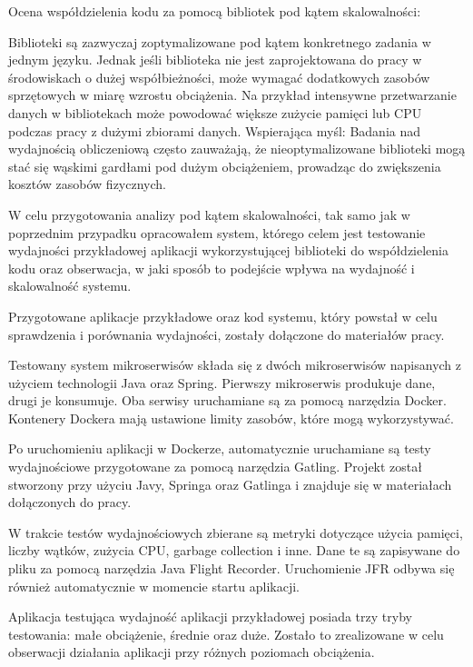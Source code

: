 \documentclass[runningheads,12pt]{llncs}
\begin{document}
\newpage


Ocena współdzielenia kodu za pomocą bibliotek pod kątem skalowalności:

Biblioteki są zazwyczaj zoptymalizowane pod kątem konkretnego zadania w jednym języku. Jednak jeśli biblioteka nie jest zaprojektowana do pracy w środowiskach o dużej współbieżności, może wymagać dodatkowych zasobów sprzętowych w miarę wzrostu obciążenia. Na przykład intensywne przetwarzanie danych w bibliotekach może powodować większe zużycie pamięci lub CPU podczas pracy z dużymi zbiorami danych. Wspierająca myśl: Badania nad wydajnością obliczeniową często zauważają, że nieoptymalizowane biblioteki mogą stać się wąskimi gardłami pod dużym obciążeniem, prowadząc do zwiększenia kosztów zasobów fizycznych. ~\cite[p. 192]{fowler2012patterns}

W celu przygotowania analizy pod kątem skalowalności, tak samo jak w poprzednim przypadku opracowałem system, którego celem jest testowanie wydajności przykładowej aplikacji wykorzystującej biblioteki do współdzielenia kodu oraz obserwacja, w jaki sposób to podejście wpływa na wydajność i skalowalność systemu.

Przygotowane aplikacje przykładowe oraz kod systemu, który powstał w celu sprawdzenia i porównania wydajności, zostały dołączone do materiałów pracy.

Testowany system mikroserwisów składa się z dwóch mikroserwisów napisanych z użyciem technologii Java oraz Spring. Pierwszy mikroserwis produkuje dane, drugi je konsumuje. Oba serwisy uruchamiane są za pomocą narzędzia Docker. Kontenery Dockera mają ustawione limity zasobów, które mogą wykorzystywać.

Po uruchomieniu aplikacji w Dockerze, automatycznie uruchamiane są testy wydajnościowe przygotowane za pomocą narzędzia Gatling. Projekt został stworzony przy użyciu Javy, Springa oraz Gatlinga i znajduje się w materiałach dołączonych do pracy.

W trakcie testów wydajnościowych zbierane są metryki dotyczące użycia pamięci, liczby wątków, zużycia CPU, garbage collection i inne. Dane te są zapisywane do pliku za pomocą narzędzia Java Flight Recorder. Uruchomienie JFR odbywa się również automatycznie w momencie startu aplikacji.

Aplikacja testująca wydajność aplikacji przykładowej posiada trzy tryby testowania: małe obciążenie, średnie oraz duże. Zostało to zrealizowane w celu obserwacji działania aplikacji przy różnych poziomach obciążenia.
\end{document}
